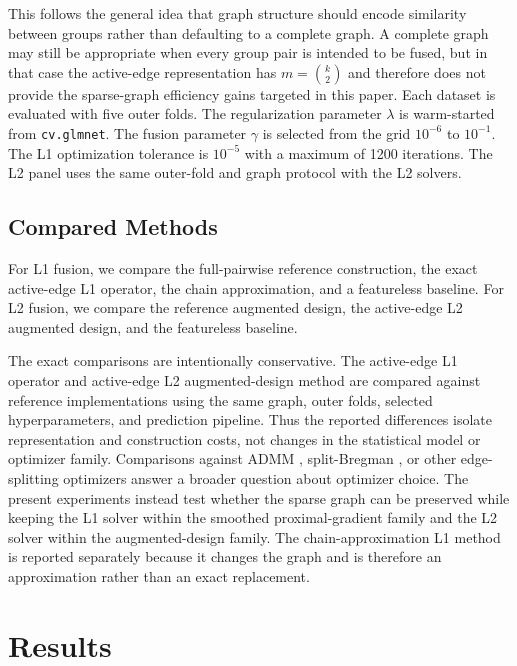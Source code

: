 \documentclass[twoside,11pt]{article}
\begin{document}
This follows the general idea that graph structure should encode similarity between groups rather than defaulting to a complete graph.
A complete graph may still be appropriate when every group pair is intended to be fused, but in that case the active-edge representation has $m=\binom{k}{2}$ and therefore does not provide the sparse-graph efficiency gains targeted in this paper.
Each dataset is evaluated with five outer folds. 
The regularization parameter $\lambda$ is warm-started from \texttt{cv.glmnet}. The fusion parameter $\gamma$ is selected from the grid $10^{-6}$ to $10^{-1}$.
The L1 optimization tolerance is $10^{-5}$ with a maximum of 1200 iterations.
The L2 panel uses the same outer-fold and graph protocol with the L2 solvers.

\subsection{Compared Methods}
For L1 fusion, we compare the full-pairwise reference construction, the exact active-edge L1 operator, the chain approximation, and a featureless baseline. 
For L2 fusion, we compare the reference augmented design, the active-edge L2 augmented design, and the featureless baseline.

The exact comparisons are intentionally conservative. 
The active-edge L1 operator and active-edge L2 augmented-design method are compared against reference implementations using the same graph, outer folds, selected hyperparameters, and prediction pipeline.
Thus the reported differences isolate representation and construction costs, not changes in the statistical model or optimizer family.
Comparisons against ADMM \citep{boyd2011admm,hallac2015network}, split-Bregman \citep{ye2011split}, or other edge-splitting optimizers answer a broader question about optimizer choice.
The present experiments instead test whether the sparse graph can be preserved while keeping the L1 solver within the smoothed proximal-gradient family \citep{chen2012smoothing} and the L2 solver within the augmented-design family.
The chain-approximation L1 method is reported separately because it changes the graph and is therefore an approximation rather than an exact replacement.

\section{Results}
\end{document}

